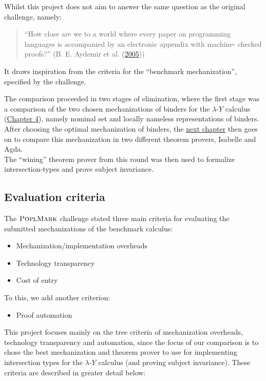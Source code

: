\documentclass[a4paper, 12pt, twoside]{style/ociamthesis}
\theoremstyle{plain}
\theoremstyle{definition}
\theoremstyle{remark}
\providecommand{\tightlist}{%
  \setlength{\itemsep}{0pt}\setlength{\parskip}{0pt}}
\newcommand{\lamy}{\lambda\text{-}Y}
\newcommand{\poplm}{\textsc{PoplMark}}
\begin{document}
Whilst this project does not aim to answer the same question as the
original challenge, namely:

\begin{quote}
``How close are we to a world where every paper on programming languages
is accompanied by an electronic appendix with machine- checked proofs?''
(B. E. Aydemir et al. (\protect\hyperlink{ref-aydemir05}{2005}))
\end{quote}

It draws inspiration from the criteria for the ``benchmark
mechanization'', specified by the challenge.

The comparison proceeded in two stages of elimination, where the first
stage was a comparison of the two chosen mechanizations of binders for
the \(\lamy\) calculus (\protect\hyperlink{comp-isa}{Chapter 4}), namely
nominal set and locally nameless representations of binders.\\
After choosing the optimal mechanization of binders, the
\protect\hyperlink{comp-agda}{next chapter} then goes on to compare this
mechanization in two different theorem provers, Isabelle and Agda.\\
The ``wining'' theorem prover from this round was then used to formalize
intersection-types and prove subject invariance.

\subsection{Evaluation criteria}\label{evaluation-criteria}

The \(\poplm\) challenge stated three main criteria for evaluating the
submitted mechanizations of the benchmark calculus:

\begin{itemize}
\tightlist
\item
  Mechanization/implementation overheads
\item
  Technology transparency
\item
  Cost of entry
\end{itemize}

To this, we add another criterion:

\begin{itemize}
\tightlist
\item
  Proof automation
\end{itemize}

This project focuses mainly on the tree criteria of mechanization
overheads, technology transparency and automation, since the focus of
our comparison is to chose the best mechanization and theorem prover to
use for implementing intersection types for the \(\lamy\) calculus (and
proving subject invariance). These criteria are described in greater
detail below:
\end{document}
